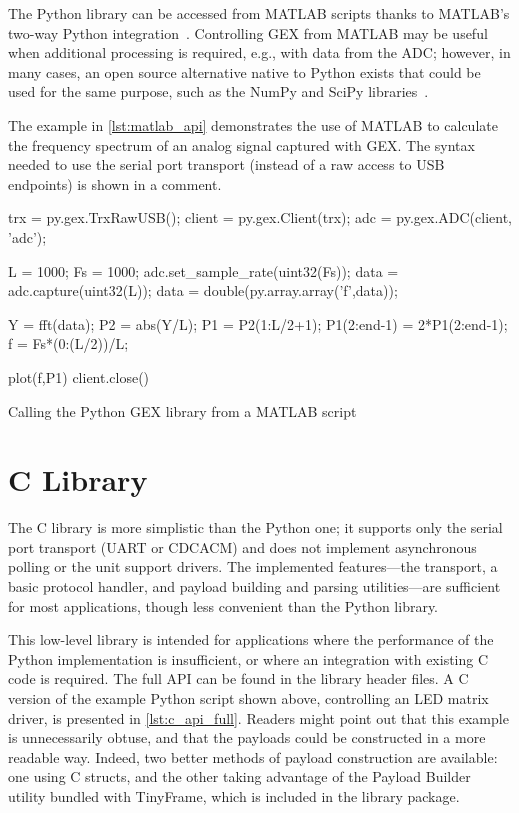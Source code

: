 The Python library can be accessed from MATLAB scripts thanks to MATLAB's two-way Python integration~\cite{matlabpy}. Controlling GEX from MATLAB may be useful when additional processing is required, e.g., with data from the \gls{ADC}; however, in many cases, an open source alternative native to Python exists that could be used for the same purpose, such as the NumPy and SciPy libraries~\cite{numpyscipy}.

The example in \cref{lst:matlab_api} demonstrates the use of MATLAB to calculate the frequency spectrum of an analog signal captured with GEX. The syntax needed to use the serial port transport (instead of a raw access to USB endpoints) is shown in a comment.

\begin{listing}[h]
	\begin{matlabcode}
	
	trx = py.gex.TrxRawUSB();
	client = py.gex.Client(trx);
	adc = py.gex.ADC(client, 'adc');
	
	L = 1000;
	Fs = 1000;
	adc.set_sample_rate(uint32(Fs)); %
	data = adc.capture(uint32(L));
	data = double(py.array.array('f',data)); %
	
	Y = fft(data);
	P2 = abs(Y/L);
	P1 = P2(1:L/2+1);
	P1(2:end-1) = 2*P1(2:end-1);
	f = Fs*(0:(L/2))/L;
	
	plot(f,P1)
	client.close()
	\end{matlabcode}
	\caption{\label{lst:matlab_api} Calling the Python GEX library from a MATLAB script}
\end{listing}


\section{C Library}

The C library is more simplistic than the Python one; it supports only the serial port transport (\gls{UART} or \gls{CDCACM}) and does not implement asynchronous polling or the unit support drivers. The implemented features---the transport, a basic protocol handler, and payload building and parsing utilities---are sufficient for most applications, though less convenient than the Python library.

This low-level library is intended for applications where the performance of the Python implementation is insufficient, or where an integration with existing C code is required. The full \gls{API} can be found in the library header files. A C version of the example Python script shown above, controlling an \gls{LED} matrix driver, is presented in \cref{lst:c_api_full}. Readers might point out that this example is unnecessarily obtuse, and that the payloads could be constructed in a more readable way. Indeed, two better methods of payload construction are available: one using C structs, and the other taking advantage of the Payload Builder utility bundled with TinyFrame, which is included in the library package.

